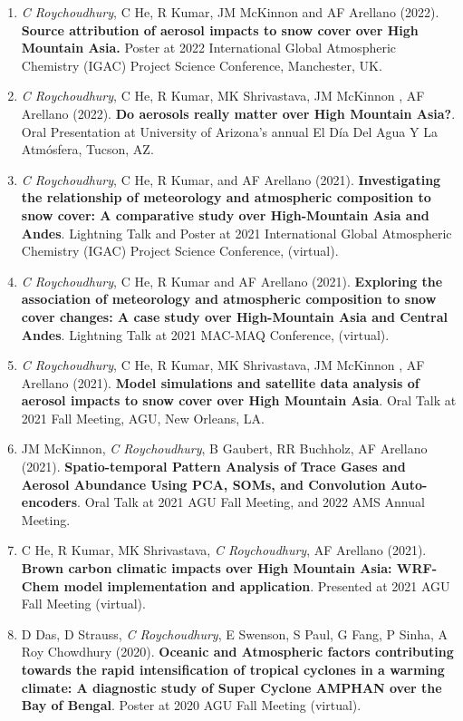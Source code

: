 \documentclass[margin,line]{resume}
\begin{document}
\begin{resume}
\begin{enumerate}[topsep=1pt, partopsep=1pt, itemsep=0.5pt, parsep=0.1pt, leftmargin=15pt,label=\arabic*.]
			\item \textit{C Roychoudhury}, C He, R Kumar, JM McKinnon and AF Arellano (2022). 
			\textbf{Source attribution of aerosol impacts to snow cover over High Mountain Asia.} Poster at 2022 International Global Atmospheric Chemistry (IGAC) Project Science Conference, Manchester, UK.
			
			\item \textit{C Roychoudhury}, C He, R Kumar, MK Shrivastava, JM McKinnon , AF Arellano (2022).
			\textbf{Do aerosols really matter over High Mountain Asia?}.
			Oral Presentation at University of Arizona's annual El Día Del Agua Y La Atmósfera, Tucson, AZ.
			
			\item \textit{C Roychoudhury}, C He, R Kumar, and AF Arellano (2021).
			\textbf{Investigating the relationship of meteorology and atmospheric composition to snow cover: A comparative study over High-Mountain Asia and Andes}.
			Lightning Talk and Poster at 2021 International Global Atmospheric Chemistry (IGAC) Project Science Conference, (virtual).
			
			\item \textit{C Roychoudhury}, C He, R Kumar and AF Arellano (2021).
		\textbf{Exploring the association of meteorology and atmospheric composition to snow cover changes: A case study over High-Mountain Asia and Central Andes}. 
	Lightning Talk at 2021 MAC-MAQ Conference, (virtual).
			
			\item \textit{C Roychoudhury}, C He, R Kumar, MK Shrivastava, JM McKinnon , AF Arellano (2021). 
			\textbf{Model simulations and satellite data analysis of aerosol impacts to snow cover over High Mountain Asia}. 
			Oral Talk at 2021 Fall Meeting, AGU, New Orleans, LA.
			
			\item JM McKinnon, \textit{C Roychoudhury}, B Gaubert, RR Buchholz, AF Arellano (2021).
			\textbf{Spatio-temporal Pattern Analysis of Trace Gases and Aerosol Abundance Using PCA, SOMs, and Convolution Auto-encoders}.
			Oral Talk at 2021 AGU Fall Meeting, and 2022 AMS Annual Meeting.
			
			\item C He, R Kumar, MK Shrivastava, \textit{C Roychoudhury}, AF Arellano (2021).
			\textbf{Brown carbon climatic impacts over High Mountain Asia: WRF-Chem model implementation and application}.
			Presented at 2021 AGU Fall Meeting (virtual).
			
			\item D Das, D Strauss, \textit{C Roychoudhury}, E Swenson, S Paul, G Fang, P Sinha, A Roy Chowdhury (2020).
			\textbf{Oceanic and Atmospheric factors contributing towards the rapid intensification of tropical cyclones in a warming climate: A diagnostic study of Super Cyclone AMPHAN over the Bay of Bengal}.
			Poster at 2020 AGU Fall Meeting (virtual).
			

\end{enumerate}
\end{resume}
\end{document}
